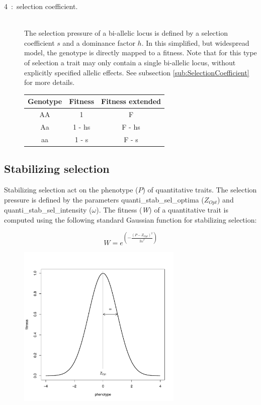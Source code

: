 \documentclass[letterpaper,12pt,oneside]{book}
\begin{document}
\begin{description}
\begin{description}
\item [4~:~selection coefficient.] \textbf{}\\
The selection pressure of a bi-allelic locus is defined by a selection coefficient $s$ and a dominance factor $h$. In this simplified, but widespread model, the genotype is directly mapped to a fitness. Note that for this type of selection a trait may only contain a single bi-allelic locus, without explicitly specified allelic effects.  See subsection \ref{sub:SelectionCoefficient} for more details.   \\

\begin{tabular}{ccc}
 \hline            
Genotype & Fitness & Fitness extended \\
\hline
AA & 1             & F      \\
Aa & 1 - hs & F - hs \\
aa & 1 - s     & F - s  \\
\hline
\end{tabular}


\end{description}
\end{description}



\subsection{Stabilizing selection}\label{sub:StabilizingSelection}
Stabilizing selection act on the phenotype ($P$) of quantitative traits. The selection pressure is defined by the parameters \textsf{quanti\_stab\_sel\_optima} ($Z_{Opt}$) and \textsf{quanti\_stab\_sel\_intensity} ($\omega$). The fitness (\textit{W}) of a quantitative trait is computed using the following standard Gaussian function for stabilizing selection: 

\[W = e^{\left(-\frac{\left(P-Z_{Opt}\right)^2}{2\omega^{2}}\right)} \]

\begin{figure}[h]
    \centering
        \includegraphics[width=0.70\textwidth]{stabilizing-selection.pdf}
    \label{fig:stabilizing-selection}
\end{figure}
\end{document}
